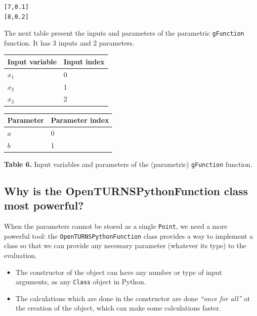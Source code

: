\documentclass[11pt]{article}
\begin{document}
    \begin{Verbatim}[commandchars=\\\{\}]
[7,0.1]
[8,0.2]
    \end{Verbatim}

    The next table present the inputs and parameters of the parametric
\texttt{gFunction} function. It has 3 inputs and 2 parameters.

\begin{longtable}[]{@{}ll@{}}
\toprule()
Input variable & Input index \\
\midrule()
\endhead
\(x_1\) & 0 \\
\(x_2\) & 1 \\
\(x_3\) & 2 \\
\bottomrule()
\end{longtable}

\begin{longtable}[]{@{}ll@{}}
\toprule()
Parameter & Parameter index \\
\midrule()
\endhead
\(a\) & 0 \\
\(b\) & 1 \\
\bottomrule()
\end{longtable}

\textbf{Table 6.} Input variables and parameters of the (parametric)
\texttt{gFunction} function.

    \hypertarget{why-is-the-openturnspythonfunction-class-most-powerful}{%
\subsection{Why is the OpenTURNSPythonFunction class most
powerful?}\label{why-is-the-openturnspythonfunction-class-most-powerful}}

When the parameters cannot be stored as a single \texttt{Point}, we need
a more powerful tool: the \texttt{OpenTURNSPythonFunction} class
provides a way to implement a class so that we can provide any necessary
parameter (whatever its type) to the evaluation.
\begin{itemize}
\item The constructor of
the object can have any number or type of input arguments, as any
\texttt{Class} object in Python.
\item The calculations which are done in
the constructor are done \emph{``once for all''} at the creation of the
object, which can make some calculations faster.
\end{itemize}
\end{document}

